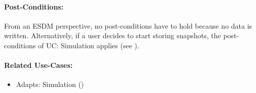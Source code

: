 \paragraph{Post-Conditions:}
From an ESDM perspective, no post-conditions have to hold because no data is written.
Alternatively, if a user decides to start storing snapshots, the post-conditions of UC: Simulation applies (see ).




\paragraph{Related Use-Cases:}
\begin{itemize}
	\item Adapts: Simulation ()
\end{itemize}


